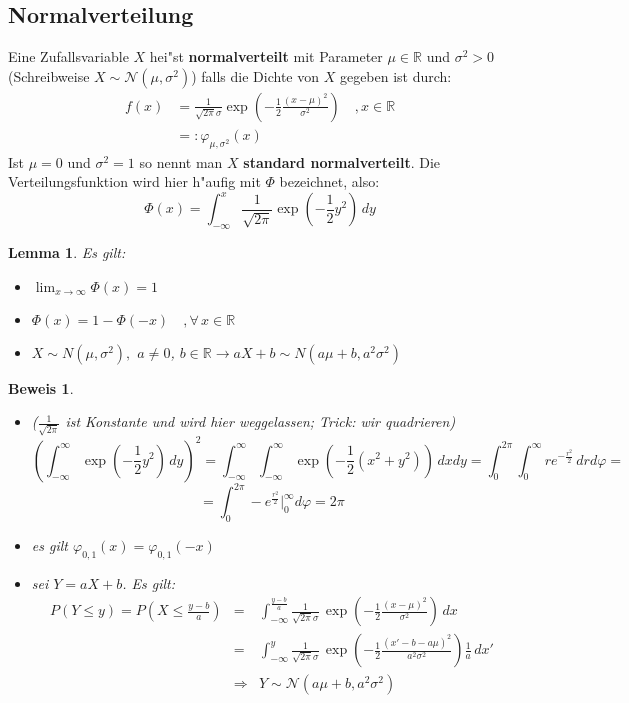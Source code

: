 \documentclass[a4paper,11pt]{book}
\newcommand{\R}{{\mathbb R}}
\def\NN{ \mathcal{N} }
\newtheorem{Lem}[Sa]{Lemma}
\theoremstyle{nonumberplain}
\newtheorem{Bew}{Beweis}
\begin{document}
\subsection{Normalverteilung}
Eine Zufallsvariable $X$ hei"st \textbf{normalverteilt} mit Parameter $\mu \in \R$ und $\sigma^2 >0$ (Schreibweise $X\sim \NN(\mu,\sigma^2)$) falls die Dichte von $X$ gegeben ist durch:
\begin{align*}
f(x)&=\frac{1}{\sqrt{2\pi}\sigma}\exp(-\frac12\frac{(x-\mu)^2}{\sigma^2})\quad,x\in\R\\
    &=:\varphi_{\mu,\sigma^2}(x)
\end{align*}
Ist $\mu = 0$ und $\sigma^2=1$ so nennt man $X$ \textbf{standard normalverteilt}. Die Verteilungsfunktion wird hier h"aufig mit $\Phi$ bezeichnet, also:
\[\Phi(x)=\int_{-\infty}^x\frac{1}{\sqrt{2\pi}}\exp(-\frac{1}{2}y^2)\,dy\]
\begin{Lem}
Es gilt:
\begin{itemize}
\item [a)] $\lim_{x\to\infty}\Phi(x)=1$
\item [b)] $\Phi(x)=1-\Phi(-x)\quad,\forall\,x\in\R$
\item [c)] $X\sim N(\mu,\sigma^2),$ $a\neq 0$, $b\in\R \rightarrow aX+b \sim N(a\mu+b,a^2\sigma^2)$
\end{itemize}
\end{Lem}
\begin{Bew}
\begin{itemize}
\item [a)] ($\frac{1}{\sqrt{2\pi}}$ ist Konstante und wird hier weggelassen; Trick: wir quadrieren)
\[(\int_{-\infty}^{\infty}\exp(-\frac{1}{2}y^2)\,dy)^2=\int_{-\infty}^{\infty}\!\int_{-\infty}^{\infty}\exp(-\frac{1}{2}(x^2+y^2))\,dx dy=\int_0^{2\pi}\!\int_0^\infty re^{-\frac{r^2}{2}}\,dr d\varphi =\]
\[=\int_0^{2\pi}-e^\frac{r^2}{2}\Bigr|_0^\infty d\varphi = 2\pi \]
\item [b)] es gilt $\varphi_{0,1}(x)=\varphi_{0,1}(-x)$
\item [c)] sei $Y=aX+b$. Es gilt:
\begin{eqnarray*}
P(Y\leq y)=P(X\leq \frac{y-b}{a}) & = & \int_{-\infty}^{\frac{y-b}{a}}\frac{1}{\sqrt{2\pi}\sigma}\,\exp(-\frac{1}{2}\frac{(x-\mu )^2}{\sigma^2})\,dx \\
& = & \int_{-\infty}^{y}\frac{1}{\sqrt{2\pi}\sigma}\,\exp(-\frac{1}{2}\frac{(x'-b-a\mu )^2}{a^2\sigma^2})\frac{1}{a}\,dx'\\
& \Rightarrow & Y\sim \NN(a\mu +b,a^2\sigma^2)
\end{eqnarray*}
\end{itemize}
\end{Bew}
\end{document}
